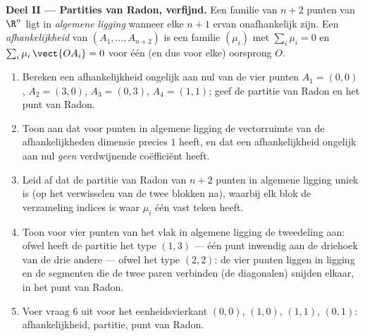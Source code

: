\begin{problem}
\medskip
\noindent\textbf{Deel II --- Partities van Radon, verfijnd.} Een
familie van $n + 2$ punten van $\R^n$ ligt in \emph{algemene
ligging} wanneer elke $n + 1$ ervan  onafhankelijk zijn. Een
\emph{ afhankelijkheid} van $(A_1, \dots, A_{n+2})$ is een
familie $(\mu_i)$ met $\sum_i \mu_i = 0$ en $\sum_i
\mu_i\,\vect{OA_i} = 0$ voor één (en dus voor elke) oorsprong $O$.
\begin{enumerate}[resume]
  \item Bereken een  afhankelijkheid ongelijk aan nul van de
        vier punten $A_1 = (0,0)$, $A_2 = (3,0)$, $A_3 = (0,3)$,
        $A_4 = (1,1)$; geef de partitie van Radon en het punt van
        Radon.
  \item Toon aan dat voor punten in algemene ligging de
        vectorruimte van de  afhankelijkheden dimensie
        precies $1$ heeft, en dat een afhankelijkheid ongelijk aan
        nul \emph{geen} verdwijnende coëfficiënt heeft.
  \item Leid af dat de partitie van Radon van $n + 2$ punten in
        algemene ligging uniek is (op het verwisselen van de twee
        blokken na), waarbij elk blok de verzameling indices is
        waar $\mu_i$ één vast teken heeft.
  \item Toon voor vier punten van het vlak in algemene ligging de
        tweedeling aan: ofwel heeft de partitie het type $(1, 3)$
        --- één punt inwendig aan de driehoek van de drie andere
        --- ofwel het type $(2, 2)$: de vier punten liggen in
         ligging en de segmenten die de twee paren
        verbinden (de diagonalen) snijden elkaar, in het punt van
        Radon.
  \item Voer vraag 6 uit voor het eenheidsvierkant $(0,0)$,
        $(1,0)$, $(1,1)$, $(0,1)$: afhankelijkheid, partitie, punt
        van Radon.
\end{enumerate}


\end{problem}
